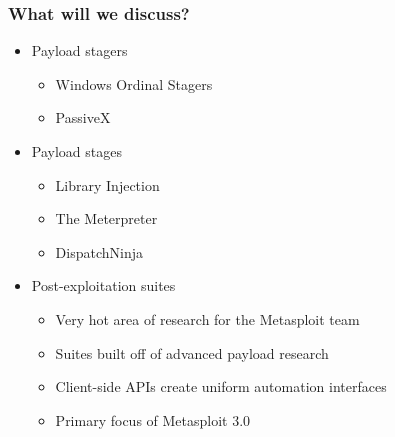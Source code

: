 \documentclass{beamer}
\newenvironment{sitemize}{\vspace{1mm}\begin{itemize}\itemsep 4pt\small}{\end{itemize}}
\begin{document}
\begin{frame}[t]
    \frametitle{What will we discuss?}

    \begin{sitemize}
        \item Payload stagers
        \begin{sitemize}
            \item Windows Ordinal Stagers
            \item PassiveX
        \end{sitemize}

        \pause
        \item Payload stages
        \begin{sitemize}
            \item Library Injection
            \item The Meterpreter
            \item DispatchNinja
        \end{sitemize}

        \pause
        \item Post-exploitation suites
        \begin{sitemize}
            \item Very hot area of research for the Metasploit team
            \item Suites built off of advanced payload research
            \item Client-side APIs create uniform automation interfaces
            \item Primary focus of Metasploit 3.0
        \end{sitemize}
    \end{sitemize}
\end{frame}
\end{document}
